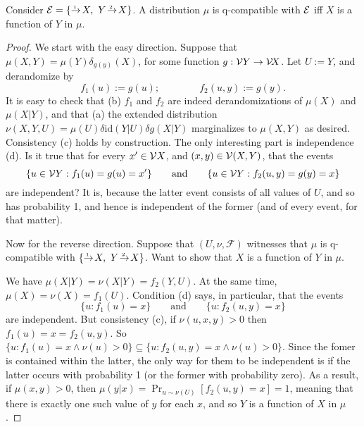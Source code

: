 \documentclass{article}
\newcommand{\CI}{\mathbin{\bot\!\!\!\bot}}
\begin{document}
\begin{prop}
    Consider $\Ed = \{ \ed 1{}{\!X},~ \ed2{Y\!}{\!X} \}$.
    A distribution $\mu$ is q-compatible with $\mathcal E$ iff
    $X$ is a function of $Y$ in $\mu$.
\end{prop}
\begin{proof}
    We start with the easy direction.  Suppose that $\mu(X,Y) = \mu(Y) \delta_{g(y)}(X)$, for some function $g : \mathcal V Y \to \mathcal V\! X$.
    Let $U := Y$, and derandomize by
    \[
        f_1(u) := g(u); \qquad\qquad
        f_2(u,y) := g(y).
    \]
    It is easy to check that (b) $f_1$ and $f_2$ are indeed derandomizations of $\mu(X)$ and $\mu(X|Y)$, and that (a) the extended distribution
    $\nu(X,Y,U) = \mu(U) \delta \mathrm{id} (Y|U)  \delta g(X|Y)$
    marginalizes to $\mu(X,Y)$ as desired.
    Consistency (c) holds by construction.
    The only interesting part  is independence (d).
    Is it true that for every $x' \in \mathcal V X$, and $(x,y) \in \mathcal V(X,Y)$, that the events
    \[
        \{ u \in \mathcal V Y : f_1(u) = g(u) = x' \}
        \qquad\text{and}\qquad
        \{ u \in \mathcal V Y : f_2(u,y) = g(y) = x\}
    \]
    are independent? It is, because the latter event consists of all values of $U$, and so has probability 1, and hence is independent of the former (and of every event, for that matter).

    Now for the reverse direction. Suppose that $(U, \nu, \mathcal F)$ witnesses that $\mu$ is q-compatible with $\{ \ed 1{}{\!X},~ \ed2{Y\!}{\!X} \}$.
    Want to show that $X$ is a function of $Y$ in $\mu$.

    We have $\mu(X|Y) = \nu(X|Y) = f_2(Y,U).$
    At the same time, $\mu(X) = \nu(X) = f_1(U)$.
    Condition (d) says, in particular, that the events
    \[
        \{ u : f_1(u) = x \} \qquad\text{and}\qquad
        \{ u : f_2(u, y) = x\}
    \]
    are independent. But consistency (c), if $\nu(u,x,y)>0$ then $f_1(u) = x = f_2(u,y)$.
    So
    $
        \{ u : f_1(u) = x \land \nu(u)>0\} \subseteq \{u : f_2(u,y) = x \land \nu(u)> 0\}
    $.
    Since the fomer is contained within the latter, the only way for them to be independent is if the latter occurs with probability 1 (or the former with probability zero).
    As a result, if $\mu(x,y) > 0$, then $\mu(y|x) = \Pr_{u \sim \nu(U)}[ f_2(u,y) = x] = 1$, meaning that there is exactly one such value of $y$ for each $x$, and so $Y$ is a function of $X$ in $\mu$.
\end{proof}
\end{document}
